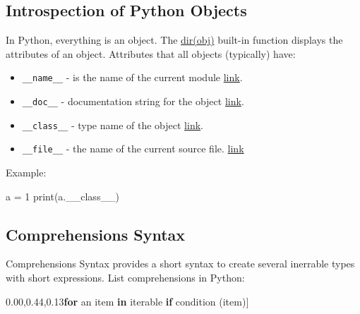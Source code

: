 \documentclass[
]{article}
\newenvironment{Shaded}{}{}
\newcommand{\BuiltInTok}[1]{#1}
\newcommand{\ControlFlowTok}[1]{\textcolor[rgb]{0.00,0.44,0.13}{\textbf{#1}}}
\newcommand{\DecValTok}[1]{\textcolor[rgb]{0.25,0.63,0.44}{#1}}
\newcommand{\KeywordTok}[1]{\textcolor[rgb]{0.00,0.44,0.13}{\textbf{#1}}}
\newcommand{\NormalTok}[1]{#1}
\newcommand{\OperatorTok}[1]{\textcolor[rgb]{0.40,0.40,0.40}{#1}}
\begin{document}
\hypertarget{introspection-of-python-objects}{%
\subsection{Introspection of Python
Objects}\label{introspection-of-python-objects}}

In Python, everything is an object. The
\href{https://docs.python.org/3/library/functions.html\#dir}{dir(obj)}
built-in function displays the attributes of an object. Attributes that
all objects (typically) have:

\begin{itemize}
\item
  \texttt{\_\_name\_\_} - is the name of the current module
  \href{https://docs.python.org/3/reference/import.html?highlight=__name__\#name__}{link}.
\item
  \texttt{\_\_doc\_\_} - documentation string for the object
  \href{https://docs.python.org/3/library/types.html?highlight=__doc__\#types.ModuleType.__doc__}{link}.
\item
  \texttt{\_\_class\_\_} - type name of the object
  \href{https://docs.python.org/3/library/stdtypes.html?highlight=__class__\#instance.__class__}{link}.
\item
  \texttt{\_\_file\_\_} - the name of the current source file.
  \href{https://docs.python.org/3/reference/import.html?highlight=__file__\#file__}{link}
\end{itemize}

Example:

\begin{Shaded}
\begin{Highlighting}[]
\NormalTok{a }\OperatorTok{=} \DecValTok{1}
\BuiltInTok{print}\NormalTok{(a.\_\_class\_\_)}
\end{Highlighting}
\end{Shaded}

\hypertarget{comprehensions-syntax}{%
\subsection{Comprehensions Syntax}\label{comprehensions-syntax}}

Comprehensions Syntax provides a short syntax to create several
inerrable types with short expressions. List comprehensions in Python:

\begin{Shaded}
\begin{Highlighting}[]
\NormalTok{[expr(item) }\ControlFlowTok{for}\NormalTok{ an item }\KeywordTok{in}\NormalTok{ iterable }\ControlFlowTok{if}\NormalTok{ condition (item)]  }
\end{Highlighting}
\end{Shaded}
\end{document}
